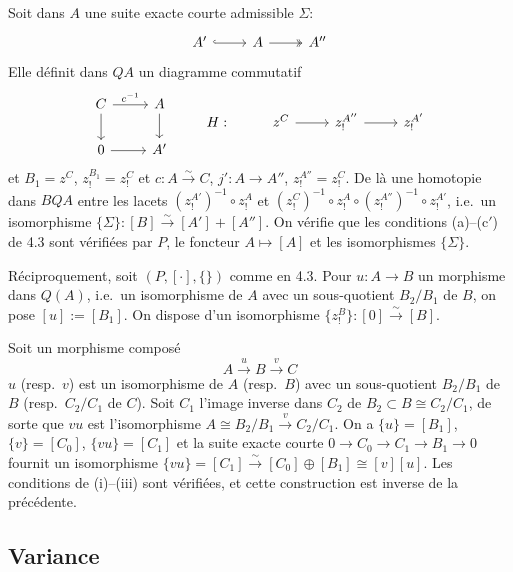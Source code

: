 \documentclass[12pt,a4paper]{article}
\theoremstyle{plain}
\theoremstyle{definition}
\begin{document}
Soit dans $A$ une suite exacte courte admissible $\Sigma$:
\[
\begin{tikzcd}
A' \arrow[r, hook] & A \arrow[r, two heads] & A''
\end{tikzcd}
\]
Elle d\'efinit dans $QA$ un diagramme commutatif
\[
\begin{tikzcd}
C \arrow[r, "c^{-1}"] \arrow[d] & A \arrow[d] \\
0 \arrow[r] & A'
\end{tikzcd}
\qquad
\begin{tikzcd}
H: & z^C \arrow[r] & z_!^{A''} \arrow[r] & z_!^{A'}
\end{tikzcd}
\]
et $B_1 = z^C$, $z_!^{B_1} = z_!^C$ et $c: A \xrightarrow{\sim} C$, $j': A \to A''$, $z_!^{A''} = z_!^C$. De l\`a une homotopie dans $BQA$ entre les lacets
$(z_!^{A'})^{-1} \circ z_!^A$ et $(z_!^C)^{-1} \circ z_!^A \circ (z_!^{A''})^{-1} \circ z_!^{A'}$, i.e.\ un isomorphisme $\{\Sigma\}: [B] \xrightarrow{\sim} [A'] + [A'']$.
On v\'erifie que les conditions (a)--(c$'$) de 4.3 sont v\'erifi\'ees par $P$, le foncteur
$A \mapsto [A]$ et les isomorphismes $\{\Sigma\}$.

R\'eciproquement, soit $(P, [\cdot], \{\})$ comme en 4.3. Pour $u: A \to B$ un
morphisme dans $Q(A)$, i.e.\ un isomorphisme de $A$ avec un sous-quotient $B_2/B_1$
de $B$, on pose $[u] := [B_1]$. On dispose d'un isomorphisme $\{z_!^B\}: [0] \xrightarrow{\sim} [B]$.

\medskip

Soit un morphisme compos\'e
\[
A \xrightarrow{u} B \xrightarrow{v} C
\]
$u$ (resp.\ $v$) est un isomorphisme de $A$ (resp.\ $B$) avec un sous-quotient $B_2/B_1$
de $B$ (resp.\ $C_2/C_1$ de $C$). Soit $C_1$ l'image inverse dans $C_2$ de $B_2 \subset
B \cong C_2/C_1$, de sorte que $vu$ est l'isomorphisme $A \cong B_2/B_1 \xrightarrow{v} C_2/C_1$. On a $\{u\} =
[B_1]$, $\{v\} = [C_0]$, $\{vu\} = [C_1]$ et la suite exacte courte $0 \to C_0 \to C_1 \to B_1 \to 0$
fournit un isomorphisme $\{vu\} = [C_1] \xrightarrow{\sim} [C_0] \oplus [B_1] \cong [v][u]$. Les conditions de
(i)--(iii) sont v\'erifi\'ees, et cette construction est inverse de la pr\'ec\'edente.

\subsection{Variance}
\end{document}
